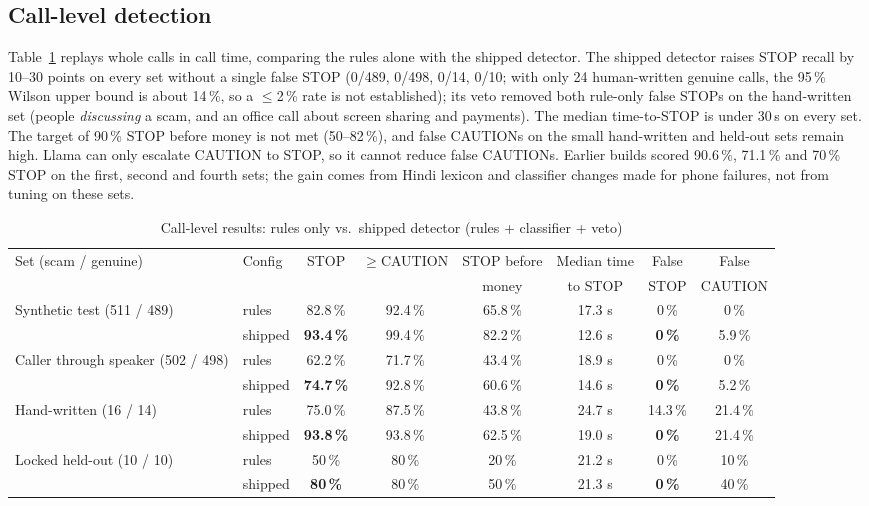 \documentclass[conference]{IEEEtran}
\begin{document}
\subsection{Call-level detection}\label{sec:calllevel}
Table~\ref{tab:guardian} replays whole calls in call time, comparing the rules alone with the shipped detector. The shipped detector raises STOP recall by 10--30 points on every set without a single false STOP (0/489, 0/498, 0/14, 0/10; with only 24 human-written genuine calls, the 95\,\% Wilson upper bound is about 14\,\%, so a $\leq$2\,\% rate is not established); its veto removed both rule-only false STOPs on the hand-written set (people \emph{discussing} a scam, and an office call about screen sharing and payments). The median time-to-STOP is under 30\,s on every set. The target of 90\,\% STOP before money is not met (50--82\,\%), and false CAUTIONs on the small hand-written and held-out sets remain high. Llama can only escalate CAUTION to STOP, so it cannot reduce false CAUTIONs. Earlier builds scored 90.6\,\%, 71.1\,\% and 70\,\% STOP on the first, second and fourth sets; the gain comes from Hindi lexicon and classifier changes made for phone failures, not from tuning on these sets.

\begin{table}[t]
\caption{Call-level results: rules only vs.\ shipped detector (rules + classifier + veto)}
\label{tab:guardian}
\centering
\footnotesize
\begin{tabular}{@{}llcccccc@{}}
\toprule
Set (scam / genuine) & Config & STOP & $\geq$CAUTION & STOP before & Median time & False & False \\
 & & & & money & to STOP & STOP & CAUTION \\
\midrule
\multirow{2}{*}{Synthetic test (511 / 489)} & rules & 82.8\,\% & 92.4\,\% & 65.8\,\% & 17.3 s & 0\,\% & 0\,\% \\
 & shipped & \textbf{93.4\,\%} & 99.4\,\% & 82.2\,\% & 12.6 s & \textbf{0\,\%} & 5.9\,\% \\
\multirow{2}{*}{Caller through speaker (502 / 498)} & rules & 62.2\,\% & 71.7\,\% & 43.4\,\% & 18.9 s & 0\,\% & 0\,\% \\
 & shipped & \textbf{74.7\,\%} & 92.8\,\% & 60.6\,\% & 14.6 s & \textbf{0\,\%} & 5.2\,\% \\
\multirow{2}{*}{Hand-written (16 / 14)} & rules & 75.0\,\% & 87.5\,\% & 43.8\,\% & 24.7 s & 14.3\,\% & 21.4\,\% \\
 & shipped & \textbf{93.8\,\%} & 93.8\,\% & 62.5\,\% & 19.0 s & \textbf{0\,\%} & 21.4\,\% \\
\multirow{2}{*}{Locked held-out (10 / 10)} & rules & 50\,\% & 80\,\% & 20\,\% & 21.2 s & 0\,\% & 10\,\% \\
 & shipped & \textbf{80\,\%} & 80\,\% & 50\,\% & 21.3 s & \textbf{0\,\%} & 40\,\% \\
\bottomrule
\end{tabular}
\end{table}
\end{document}
